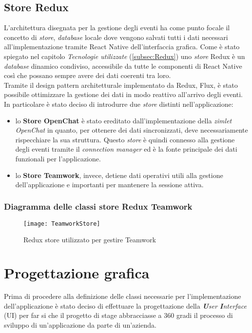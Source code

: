 \subsection{Store Redux}
L'architettura disegnata per la gestione degli eventi ha come punto focale il concetto di \emph{store}, \emph{database} locale dove vengono salvati tutti i dati necessari all'implementazione tramite React Native dell'interfaccia grafica. Come è stato spiegato nel capitolo \emph{Tecnologie utilizzate} (\ref{subsec:Redux}) uno \emph{store} Redux è un \emph{database} dinamico condiviso, accessibile da tutte le componenti di React Native così che possano sempre avere dei dati coerenti tra loro. \\
Tramite il design pattern architetturale implementato da Redux, Flux, è stato possibile ottimizzare la gestione dei dati in modo reattivo all'arrivo degli eventi. \\
In particolare è stato deciso di introdurre due \emph{store} distinti nell'applicazione:
\begin{itemize}
	\item lo \textbf{Store OpenChat }è stato ereditato dall'implementazione della \emph{zimlet OpenChat} in quanto, per ottenere dei dati sincronizzati, deve necessariamente rispecchiare la sua struttura. Questo \emph{store} è quindi connesso alla gestione degli eventi tramite il \emph{connection manager} ed è la fonte principale dei dati funzionali per l'applicazione.
	\item lo \textbf{Store Teamwork}, invece, detiene dati operativi utili alla gestione dell'applicazione e importanti per mantenere la sessione attiva.
\end{itemize} 
\subsubsection{Diagramma delle classi store Redux Teamwork}
\begin{figure}[H] 
	\centering
	\texttt{[image: TeamworkStore]}
	\caption{Redux store utilizzato per gestire Teamwork}
\end{figure}

\section{Progettazione grafica}
Prima di procedere alla definizione delle classi necessarie per l'implementazione 
dell'applicazione è stato deciso di effettuare la progettazione della \emph{\textbf{U}ser \textbf{I}nterface} (\acrshort{UI}) per far 
si che il progetto di stage abbracciasse a 360 gradi il processo di sviluppo di 
un'applicazione da parte di un'azienda.

